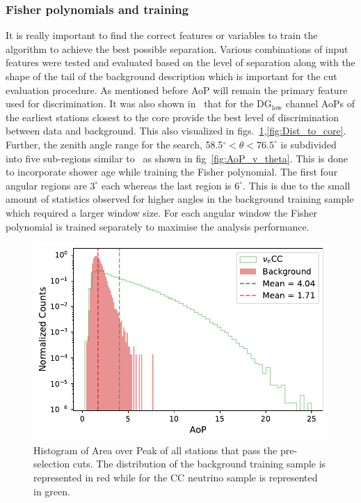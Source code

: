 \subsubsection{Fisher polynomials and training}
\label{subsubsec:nu_sel_fisher_training}
It is really important to find the correct features or variables to train the algorithm to achieve the best possible separation. Various combinations of input features were tested and evaluated based on the level of separation along with the shape of the tail of the background description which is important for the cut evaluation procedure. As mentioned before AoP will remain the primary feature used for discrimination. It was also shown in~\cite{gap_note_2013} that for the DG$\mathrm{_{low}}$ channel AoPs of the earliest stations closest to the core provide the best level of discrimination between data and background. This also visualized in figs.~\ref{fig:Time_to_core},\ref{fig:Dist_to_core}. Further, the zenith angle range for the search, 58.5$^\circ < \theta < 76.5^\circ$ is subdivided into five sub-regions similar to~\cite{gap_note_2013} as shown in fig~\ref{fig:AoP_v_theta}. This is done to incorporate shower age while training the Fisher polynomial. The first four angular regions are $3^\circ$ each whereas the last region is $6^\circ$. This is due to the small amount of statistics observed for higher angles in the background training sample which required a larger window size. For each angular window the Fisher polynomial is trained separately to maximise the analysis performance. 

\begin{figure}[h!]
  \centering
  \includegraphics[width=\textwidth]{thesis_figures/Nu_analysis/Selection_Evo_AoP_hist_wnt_redcut.pdf}
  \caption{Histogram of Area over Peak of all stations that pass the pre-selection cuts. The distribution of the background training sample is represented in red while for the CC neutrino sample is represented in green.}
  \label{fig:Time_to_core}
\end{figure}

